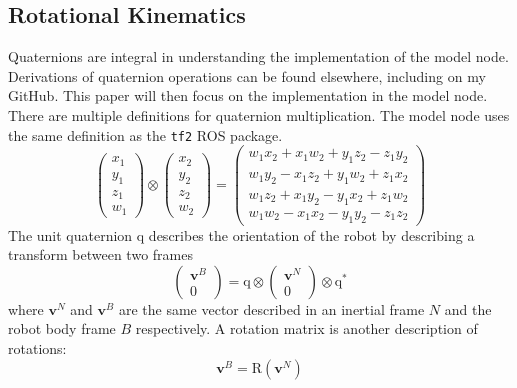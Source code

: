 \documentclass[lettersize,journal]{IEEEtran}
\begin{document}
\subsection{Rotational Kinematics}
Quaternions are integral in understanding the implementation of the model node.
Derivations of quaternion operations can be found elsewhere, including on my GitHub.
This paper will then focus on the implementation in the model node.
There are multiple definitions for quaternion multiplication.
The model node uses the same definition as the \texttt{tf2} ROS package.
\begin{equation}
  \begin{pmatrix}
    x_1 \\
    y_1 \\
    z_1 \\
    w_1
  \end{pmatrix} \otimes
  \begin{pmatrix}
    x_2 \\
    y_2 \\
    z_2 \\
    w_2
  \end{pmatrix} =
  \begin{pmatrix}
    w_1x_2 + x_1w_2 + y_1z_2 - z_1y_2 \\
    w_1y_2 - x_1z_2 + y_1w_2 + z_1x_2 \\
    w_1z_2 + x_1y_2 - y_1x_2 + z_1w_2 \\
    w_1w_2 - x_1x_2 - y_1y_2 - z_1z_2
  \end{pmatrix}
\end{equation}
The unit quaternion $\mathrm{q}$ describes the orientation of the robot by describing a transform between two frames
\begin{equation}
  \begin{pmatrix}    
    \mathbf{v}^B \\
    0
  \end{pmatrix}
  = \mathrm{q} \otimes
  \begin{pmatrix}
    \mathbf{v}^N \\
    0
  \end{pmatrix}\otimes
  \mathrm{q}^*
\end{equation}
where $\mathbf{v}^N$ and $\mathbf{v}^B$ are the same vector described in an inertial frame $N$ and the robot body frame $B$ respectively.
A rotation matrix is another description of rotations:
\begin{equation}
  \mathbf{v}^B = \mathrm{R}\left(\mathbf{v}^N\right)
\end{equation}
\end{document}

